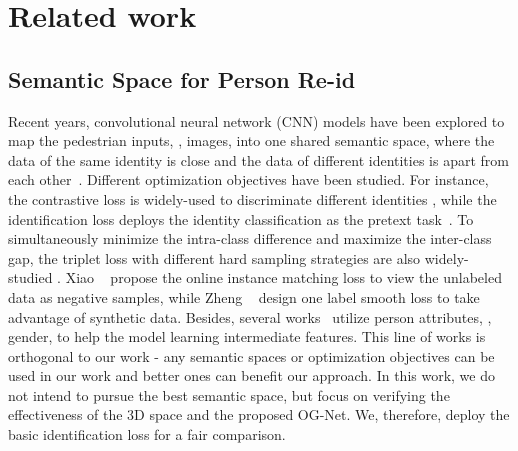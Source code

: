 \section{Related work}
\subsection{Semantic Space for Person Re-id} 
Recent years, convolutional neural network (CNN) models have been explored to map the pedestrian inputs, \eg, images, into one shared semantic space, where the data of the same identity is close and the data of different identities is apart from each other~\cite{yang2017enhancing,zhang2016learning}. Different optimization objectives have been studied. For instance, the contrastive loss is widely-used to discriminate different identities \cite{yi2014deep,zheng2018discriminatively,lin2018unsupervised}, while the identification loss deploys the identity classification as the pretext task~\cite{zheng2016survey,zhong2018camera,yu2017devil}. To simultaneously minimize the intra-class difference and maximize the inter-class gap, the triplet loss with different hard sampling strategies are also widely-studied \cite{hermans2017defense,ristani2018features,yang2018person}. Xiao \etal~\cite{xiao2017joint} propose the online instance matching loss to view the unlabeled data as negative samples, while Zheng \etal~\cite{zheng2017unlabeled} design one label smooth loss to take advantage of synthetic data. Besides, several works~\cite{lin2019improving,wang2018transferable,wang2017attribute} utilize person attributes, \eg, gender, to help the model learning intermediate features. This line of works is orthogonal to our work - any semantic spaces or optimization objectives can be used in our work and better ones can benefit our approach. In this work, we do not intend to pursue the best semantic space, but focus on verifying the effectiveness of the 3D space and the proposed OG-Net. We, therefore, deploy the basic identification loss for a fair comparison.

